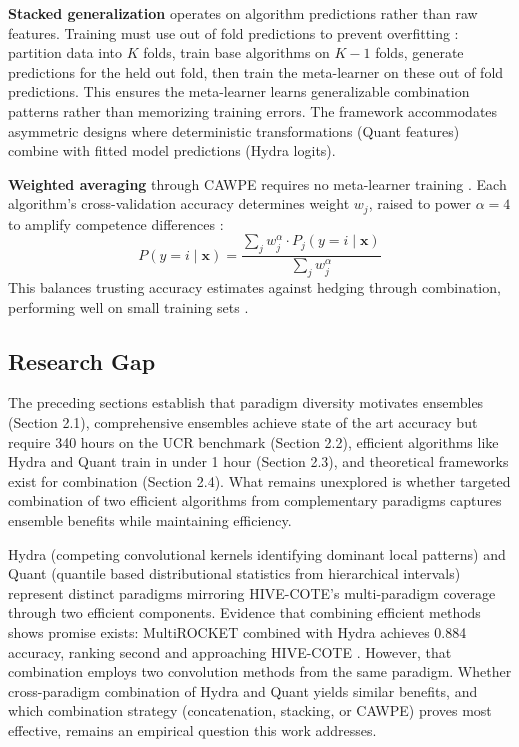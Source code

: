 \documentclass[pdflatex,sn-basic]{sn-jnl}           %
\theoremstyle{thmstyleone}%
\theoremstyle{thmstyletwo}%
\theoremstyle{thmstylethree}%
\begin{document}
\textbf{Stacked generalization} \citep{stacked-generalization} operates on algorithm predictions rather than raw features. Training must use out of fold predictions to prevent overfitting \citep[p.~244]{stacked-generalization}: partition data into $K$ folds, train base algorithms on $K-1$ folds, generate predictions for the held out fold, then train the meta-learner on these out of fold predictions. This ensures the meta-learner learns generalizable combination patterns rather than memorizing training errors. The framework accommodates asymmetric designs where deterministic transformations (Quant features) combine with fitted model predictions (Hydra logits).

\textbf{Weighted averaging} through CAWPE requires no meta-learner training \citep{cawpe}. Each algorithm's cross-validation accuracy determines weight $w_j$, raised to power $\alpha=4$ to amplify competence differences \citep[p.~1675]{cawpe}:
\begin{equation}
P(y=i \mid \mathbf{x}) = \frac{\sum_j w_j^\alpha \cdot P_j(y=i \mid \mathbf{x})}{\sum_j w_j^\alpha}
\end{equation}
This balances trusting accuracy estimates against hedging through combination, performing well on small training sets \citep[Table~3, p.~1693]{cawpe}.

\subsection{Research Gap}

The preceding sections establish that paradigm diversity motivates ensembles (Section 2.1), comprehensive ensembles achieve state of the art accuracy but require 340 hours on the UCR benchmark (Section 2.2), efficient algorithms like Hydra and Quant train in under 1 hour (Section 2.3), and theoretical frameworks exist for combination (Section 2.4). What remains unexplored is whether targeted combination of two efficient algorithms from complementary paradigms captures ensemble benefits while maintaining efficiency.

Hydra (competing convolutional kernels identifying dominant local patterns) and Quant (quantile based distributional statistics from hierarchical intervals) represent distinct paradigms mirroring HIVE-COTE's multi-paradigm coverage through two efficient components. Evidence that combining efficient methods shows promise exists: MultiROCKET combined with Hydra achieves 0.884 accuracy, ranking second and approaching HIVE-COTE \citep[Table~14, p.~2008]{bakeoff-redux}. However, that combination employs two convolution methods from the same paradigm. Whether cross-paradigm combination of Hydra and Quant yields similar benefits, and which combination strategy (concatenation, stacking, or CAWPE) proves most effective, remains an empirical question this work addresses.
\end{document}
